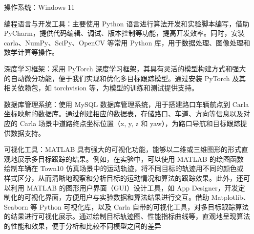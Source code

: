 操作系统：Windows 11

编程语言与开发工具：主要使用 Python 语言进行算法开发和实验脚本编写，借助 PyCharm，提供代码编辑、调试、版本控制等功能，提高开发效率。同时，安装 carla、NumPy、SciPy、OpenCV 等常用 Python 库，用于数据处理、图像处理和数学计算等操作。

深度学习框架：采用 PyTorch 深度学习框架，其具有灵活的模型构建方式和强大的自动微分功能，便于我们实现和优化多目标跟踪模型。通过安装 PyTorch 及其相关依赖包，如 torchvision 等，为模型的训练和测试提供支持。

数据库管理系统：使用 MySQL 数据库管理系统，用于搭建路口车辆航点到 Carla 坐标映射的数据库。通过创建相应的数据表，存储路口、车道、方向等信息以及对应的 Carla 场景中道路终点坐标位置（x, y, z 和 yaw），为路口导航和目标跟踪提供数据支持。

可视化工具：MATLAB 具有强大的可视化功能，能够以二维或三维图形的形式直观地展示多目标跟踪的结果。例如，在实验中，可以使用 MATLAB 的绘图函数绘制车辆在 Town10 仿真场景中的运动轨迹，将不同目标的轨迹用不同的颜色或样式区分，从而清晰地观察和分析目标的运动情况和算法的跟踪效果。此外，还可以利用 MATLAB 的图形用户界面（GUI）设计工具，如 App Designer，开发定制化的可视化界面，方便用户与实验数据和算法结果进行交互。借助 Matplotlib、Seaborn 等 Python 可视化库，以及 Carla 自带的可视化工具，对多目标跟踪算法的结果进行可视化展示。通过绘制目标轨迹图、性能指标曲线等，直观地呈现算法的性能和效果，便于分析和比较不同模型之间的差异


